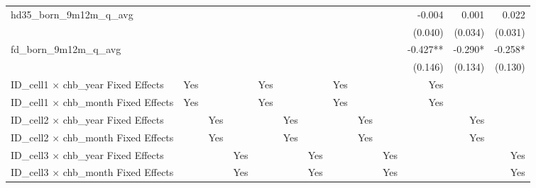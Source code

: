 \begin{tabular}{lrrrrrrrrrrrr}
hd35\_born\_9m12m\_q\_avg                   &              &              &              &              &              &              &              &              &              &       -0.004 &        0.001 &        0.022 \\ 
                                            &              &              &              &              &              &              &              &              &              &      (0.040) &      (0.034) &      (0.031) \\ 
fd\_born\_9m12m\_q\_avg                     &              &              &              &              &              &              &              &              &              &     -0.427** &      -0.290* &      -0.258* \\ 
                                            &              &              &              &              &              &              &              &              &              &      (0.146) &      (0.134) &      (0.130) \\ 
\midrule
ID\_cell1 $\times$ chb\_year Fixed Effects  &          Yes &              &              &          Yes &              &              &          Yes &              &              &          Yes &              &              \\ 
ID\_cell1 $\times$ chb\_month Fixed Effects &          Yes &              &              &          Yes &              &              &          Yes &              &              &          Yes &              &              \\ 
ID\_cell2 $\times$ chb\_year Fixed Effects  &              &          Yes &              &              &          Yes &              &              &          Yes &              &              &          Yes &              \\ 
ID\_cell2 $\times$ chb\_month Fixed Effects &              &          Yes &              &              &          Yes &              &              &          Yes &              &              &          Yes &              \\ 
ID\_cell3 $\times$ chb\_year Fixed Effects  &              &              &          Yes &              &              &          Yes &              &              &          Yes &              &              &          Yes \\ 
ID\_cell3 $\times$ chb\_month Fixed Effects &              &              &          Yes &              &              &          Yes &              &              &          Yes &              &              &          Yes \\ 

\end{tabular}
